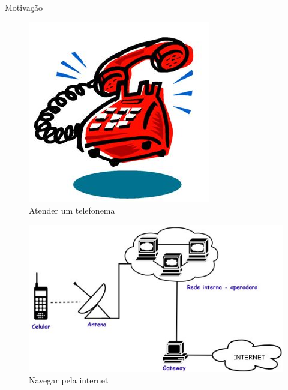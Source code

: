   \begin{frame}{Motivação}
   \begin{figure}[h]
     \centering
     \includegraphics[scale=0.3]{telephone-ringing.jpg}
     \caption{Atender um telefonema\cite{VF:2012}}
     \label{fig9:tel}
   \end{figure}


   \begin{figure}[h]
     \centering
     \includegraphics[scale=0.2]{internet-celular.jpg}
     \caption{Navegar pela internet\cite{FBP:2012}}
     \label{fig10:internet}
   \end{figure}
  \end{frame}

